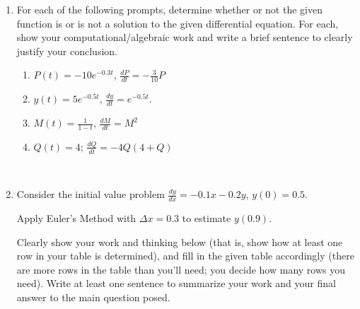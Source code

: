 \documentclass[11 pt]{article}
\newcommand{\tr}{\vspace{0.5in}}
\newcommand{\lr}{\vspace{1.0in}}
\newcommand{\be}{\begin{enumerate}}
\newcommand{\ee}{\end{enumerate}}
\begin{document}
\begin{enumerate}


\item[9.] For each of the following prompts, determine whether or not the given function is or is not a solution to the given differential equation.  For each, show your computational/algebraic work and write a brief sentence to clearly justify your conclusion.
	
	
	\be
		\item $P(t) = -10e^{-0.3t}$, $\frac{dP}{dt} = -\frac{3}{10}P$
	
		\lr \tr \tr
	
		\item $y(t) = 5 e^{-0.5t}$, $\frac{dy}{dt} = e^{-0.5t}$.
		
		\lr \tr \tr
		
		\item $M(t) = \frac{1}{1-t}$, $\frac{dM}{dt} = M^2$
		
		\lr \tr \tr
		
		\item $Q(t) = 4$; $\frac{dQ}{dt} = -4Q(4+Q)$
		
		\	

	\ee
	

\pagebreak


\item[10.] Consider the initial value problem $\frac{dy}{dx} = -0.1x - 0.2y$, $y(0) = 0.5$.

Apply Euler's Method with $\Delta x = 0.3$ to estimate $y(0.9)$.  

Clearly show your work and thinking below (that is, show how at least one row in your table is determined), and fill in the given table accordingly (there are more rows in the table than you'll need; you decide how many rows you need).  Write at least one sentence to summarize your work and your final answer to the main question posed.



\end{enumerate}
\end{document}
